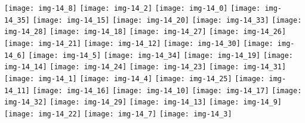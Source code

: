 \documentclass[a4paper]{article}
\begin{document}
	\texttt{[image: img-14\_8]}
	\texttt{[image: img-14\_2]}
	\texttt{[image: img-14\_0]}
	\texttt{[image: img-14\_35]}
	\texttt{[image: img-14\_15]}
	\texttt{[image: img-14\_20]}
	\texttt{[image: img-14\_33]}
	\texttt{[image: img-14\_28]}
	\texttt{[image: img-14\_18]}
	\texttt{[image: img-14\_27]}
	\texttt{[image: img-14\_26]}
	\texttt{[image: img-14\_21]}
	\texttt{[image: img-14\_12]}
	\texttt{[image: img-14\_30]}
	\texttt{[image: img-14\_6]}
	\texttt{[image: img-14\_5]}
	\texttt{[image: img-14\_34]}
	\texttt{[image: img-14\_19]}
	\texttt{[image: img-14\_14]}
	\texttt{[image: img-14\_24]}
	\texttt{[image: img-14\_23]}
	\texttt{[image: img-14\_31]}
	\texttt{[image: img-14\_1]}
	\texttt{[image: img-14\_4]}
	\texttt{[image: img-14\_25]}
	\texttt{[image: img-14\_11]}
	\texttt{[image: img-14\_16]}
	\texttt{[image: img-14\_10]}
	\texttt{[image: img-14\_17]}
	\texttt{[image: img-14\_32]}
	\texttt{[image: img-14\_29]}
	\texttt{[image: img-14\_13]}
	\texttt{[image: img-14\_9]}
	\texttt{[image: img-14\_22]}
	\texttt{[image: img-14\_7]}
	\texttt{[image: img-14\_3]}
\end{document}
